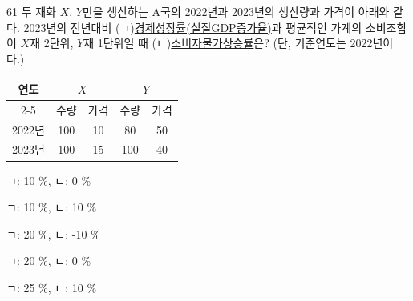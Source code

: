 \begin{question}{61}
두 재화 $X$, $Y$만을 생산하는 A국의 2022년과 2023년의 생산량과 가격이 아래와 같다. 2023년의 전년대비 (ㄱ)\uline{경제성장률(실질GDP증가율)}과 평균적인 가계의 소비조합이 $X$재 2단위, $Y$재 1단위일 때 (ㄴ)\uline{소비자물가상승률}은? (단, 기준연도는 2022년이다.)
\begin{center}\small\begin{tabular}{|c|c|c|c|c|}\hline
\multirow{2}{*}{연도} & \multicolumn{2}{c|}{$X$} & \multicolumn{2}{c|}{$Y$} \\ \cline{2-5}
 & 수량 & 가격 & 수량 & 가격 \\ \hline
2022년 & 100 & 10 & 80 & 50 \\ \hline
2023년 & 100 & 15 & 100 & 40 \\ \hline
\end{tabular}
\end{center}
\begin{choices}
  \item ㄱ: 10 \%, ㄴ: 0 \%
  \item ㄱ: 10 \%, ㄴ: 10 \%
  \item ㄱ: 20 \%, ㄴ: -10 \%
  \item ㄱ: 20 \%, ㄴ: 0 \%
  \item ㄱ: 25 \%, ㄴ: 10 \%
\end{choices}
\end{question}

